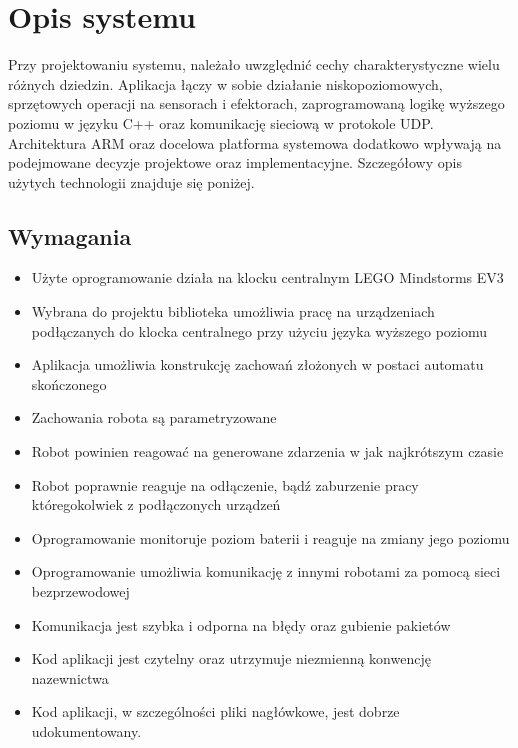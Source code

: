 \chapter{Opis systemu}
\label{ch:opis_systemu}

Przy projektowaniu systemu, należało uwzględnić cechy charakterystyczne wielu różnych dziedzin. Aplikacja łączy w sobie działanie niskopoziomowych, sprzętowych operacji na sensorach i efektorach, zaprogramowaną logikę wyższego poziomu w języku C++ oraz komunikację sieciową w protokole UDP. Architektura ARM oraz docelowa platforma systemowa dodatkowo wpływają na podejmowane decyzje projektowe oraz implementacyjne. Szczegółowy opis użytych technologii znajduje się poniżej.

\section{Wymagania}
\begin{itemize}
    \item Użyte oprogramowanie działa na klocku centralnym LEGO Mindstorms EV3
    \item Wybrana do projektu biblioteka umożliwia pracę na urządzeniach podłączanych do klocka centralnego przy użyciu języka wyższego poziomu
    \item Aplikacja umożliwia konstrukcję zachowań złożonych w postaci automatu skończonego
    \item Zachowania robota są parametryzowane
    \item Robot powinien reagować na generowane zdarzenia w jak najkrótszym czasie
    \item Robot poprawnie reaguje na odłączenie, bądź zaburzenie pracy któregokolwiek z podłączonych urządzeń
    \item Oprogramowanie monitoruje poziom baterii i reaguje na zmiany jego poziomu
    \item Oprogramowanie umożliwia komunikację z innymi robotami za pomocą sieci bezprzewodowej
    \item Komunikacja jest szybka i odporna na błędy oraz gubienie pakietów
    \item Kod aplikacji jest czytelny oraz utrzymuje niezmienną konwencję\\nazewnictwa
    \item Kod aplikacji, w szczególności pliki nagłówkowe, jest dobrze\\udokumentowany.
\end{itemize}

